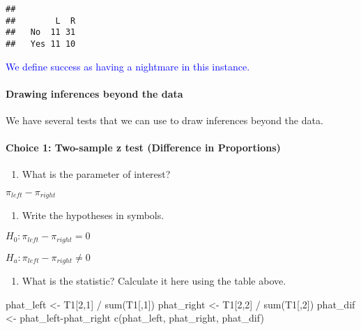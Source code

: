 \documentclass[
]{article}
\newenvironment{Shaded}{\begin{snugshade}}{\end{snugshade}}
\newcommand{\DecValTok}[1]{\textcolor[rgb]{0.00,0.00,0.81}{#1}}
\newcommand{\FunctionTok}[1]{\textcolor[rgb]{0.00,0.00,0.00}{#1}}
\newcommand{\NormalTok}[1]{#1}
\newcommand{\OtherTok}[1]{\textcolor[rgb]{0.56,0.35,0.01}{#1}}
\newcommand{\SpecialCharTok}[1]{\textcolor[rgb]{0.00,0.00,0.00}{#1}}
\providecommand{\tightlist}{%
  \setlength{\itemsep}{0pt}\setlength{\parskip}{0pt}}
\begin{document}
\begin{verbatim}
##      
##        L  R
##   No  11 31
##   Yes 11 10
\end{verbatim}

\textcolor{blue}{We define success as having a nightmare in this instance.}
\vspace{0.5in}

\hypertarget{drawing-inferences-beyond-the-data}{%
\paragraph{Drawing inferences beyond the
data}\label{drawing-inferences-beyond-the-data}}

We have several tests that we can use to draw inferences beyond the
data.

\hypertarget{choice-1-two-sample-z-test-difference-in-proportions}{%
\paragraph{Choice 1: Two-sample z test (Difference in
Proportions)}\label{choice-1-two-sample-z-test-difference-in-proportions}}

\begin{enumerate}
\def\labelenumi{(\arabic{enumi})}
\setcounter{enumi}{3}
\tightlist
\item
  What is the parameter of interest?
\end{enumerate}

\(\pi_{left}-\pi_{right}\) \vspace{0.5in}

\begin{enumerate}
\def\labelenumi{(\arabic{enumi})}
\setcounter{enumi}{4}
\tightlist
\item
  Write the hypotheses in symbols.
\end{enumerate}

\(H_0:\pi_{left}-\pi_{right} = 0\)

\(H_a:\pi_{left}-\pi_{right} \neq 0\) \vspace{0.5in}

\begin{enumerate}
\def\labelenumi{(\arabic{enumi})}
\setcounter{enumi}{5}
\tightlist
\item
  What is the statistic? Calculate it here using the table above.
\end{enumerate}

\begin{Shaded}
\begin{Highlighting}[]
\NormalTok{phat\_left }\OtherTok{\textless{}{-}}\NormalTok{ T1[}\DecValTok{2}\NormalTok{,}\DecValTok{1}\NormalTok{] }\SpecialCharTok{/} \FunctionTok{sum}\NormalTok{(T1[,}\DecValTok{1}\NormalTok{])}
\NormalTok{phat\_right }\OtherTok{\textless{}{-}}\NormalTok{ T1[}\DecValTok{2}\NormalTok{,}\DecValTok{2}\NormalTok{] }\SpecialCharTok{/} \FunctionTok{sum}\NormalTok{(T1[,}\DecValTok{2}\NormalTok{])}
\NormalTok{phat\_dif }\OtherTok{\textless{}{-}}\NormalTok{ phat\_left}\SpecialCharTok{{-}}\NormalTok{phat\_right}
\FunctionTok{c}\NormalTok{(phat\_left, phat\_right, phat\_dif)}
\end{Highlighting}
\end{Shaded}
\end{document}
